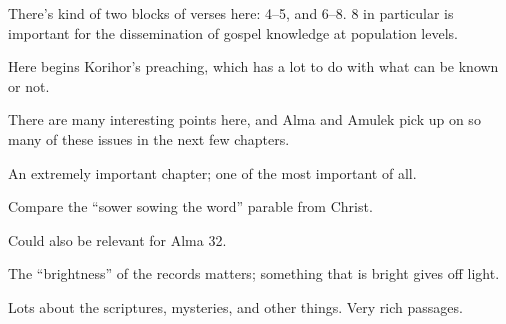 \begin{compactdesc}
			\item[{\hyperref[ALMA-29-4]{Alma 29:4--8}}] \phantom{.}
				\begin{compactitem}
					\item There's kind of two blocks of verses here: 4--5, and 6--8. 8 in particular is important for the dissemination of gospel knowledge at population levels.
				\end{compactitem} 
			\item[{\hyperref[ALMA-30-13]{Alma 30:13--60}}] \phantom{.}
				\begin{compactitem}
					\item Here begins Korihor's preaching, which has a lot to do with what can be known or not.
					\item There are many interesting points here, and Alma and Amulek pick up on so many of these issues in the next few chapters.
				\end{compactitem}
			\item[{\hyperref[ALMA-31-5]{Alma 31:5}}]
			\item[{\hyperref[ALMA-32]{Alma 32}}]
				\begin{compactitem}
					\item An extremely important chapter; one of the most important of all.
					\item Compare the ``sower sowing the word'' parable from Christ.
				\end{compactitem}
			\item[{\hyperref[ALMA-33-19]{Alma 33:19--21}}]
			\item[{\hyperref[ALMA-34-33]{Alma 34:33--39}}]
			\item[{\hyperref[ALMA-36-4]{Alma 36:4--5}}]
			\item[{\hyperref[ALMA-36-18]{Alma 36:18--26}}] \phantom{.}
				\begin{compactitem}
					\item Could also be relevant for Alma 32.
				\end{compactitem}
			\item[{\hyperref[ALMA-37-4]{Alma 37:4--5}}] \phantom{.}
				\begin{compactitem}
					\item The ``brightness'' of the records matters; something that is bright gives off light.
				\end{compactitem}
			\item[{\hyperref[ALMA-37-6]{Alma 37:6--12}}] \phantom{.}
				\begin{compactitem}
					\item Lots about the scriptures, mysteries, and other things. Very rich passages.

\end{compactitem}
\end{compactdesc}
